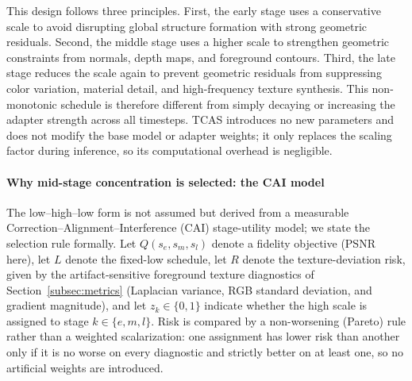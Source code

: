 \documentclass[times,twocolumn,final]{elsarticle}
\providecommand{\DIFadd}[1]{{\protect\color{blue} \sf #1}} %
\providecommand{\DIFaddbegin}{} %
\newcommand{\DIFaddincludegraphics}[2][]{{\color{blue}\fbox{\DIFOincludegraphics[#1]{#2}}}} %
\DeclareRobustCommand{\DIFaddbegin}{\DIFOaddbegin \let\includegraphics\DIFaddincludegraphics} %
\begin{document}
This design follows three principles. First, the early stage uses a conservative scale to avoid disrupting global structure formation with strong geometric residuals. Second, the middle stage uses a higher scale to strengthen geometric constraints from normals, depth maps, and foreground contours. Third, the late stage reduces the scale again to prevent geometric residuals from suppressing color variation, material detail, and high-frequency texture synthesis. This non-monotonic schedule is therefore different from simply decaying or increasing the adapter strength across all timesteps. TCAS introduces no new parameters and does not modify the base model or adapter weights; it only replaces the scaling factor during inference, so its computational overhead is negligible.

\DIFaddbegin \paragraph{\DIFadd{Why mid-stage concentration is selected: the CAI model}}
\DIFadd{The low--high--low form is not assumed but derived from a measurable Correction--Alignment--Interference (CAI) stage-utility model; we state the selection rule formally. Let $Q(s_e,s_m,s_l)$ denote a fidelity objective (PSNR here), let $L$ denote the fixed-low schedule, let $R$ denote the texture-deviation risk, given by the artifact-sensitive foreground texture diagnostics of Section~\ref{subsec:metrics} (Laplacian variance, RGB standard deviation, and gradient magnitude), and let $z_k\in\{0,1\}$ indicate whether the high scale is assigned to stage $k\in\{e,m,l\}$. Risk is compared by a non-worsening (Pareto) rule rather than a weighted scalarization: one assignment has lower risk than another only if it is no worse on every diagnostic and strictly better on at least one, so no artificial weights are introduced.
}
\end{document}
